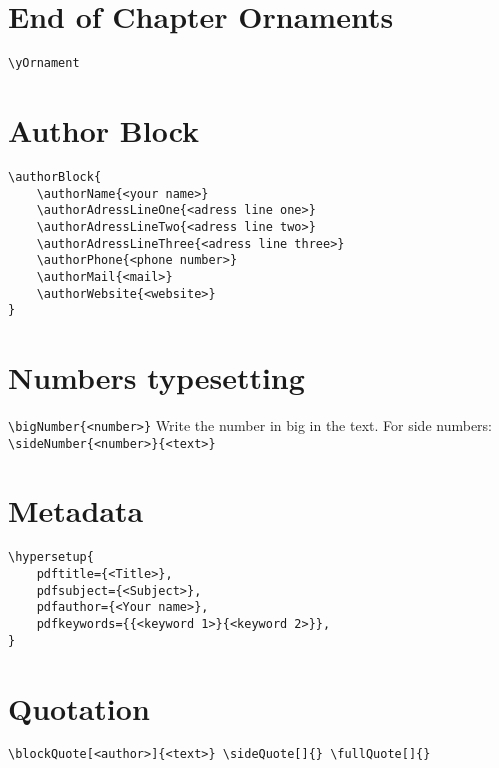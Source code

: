 \documentclass[a4paper, 11pt, oneside, fleqn]{article}
\begin{document}
\begin{multicols}{2}
		
		\section{End of Chapter Ornaments}
		\lstinline[breaklines]|\yOrnament|
		
		
		\section{Author Block}
		\begin{lstlisting}[breaklines]
\authorBlock{
	\authorName{<your name>}
	\authorAdressLineOne{<adress line one>}
	\authorAdressLineTwo{<adress line two>}
	\authorAdressLineThree{<adress line three>}
	\authorPhone{<phone number>}
	\authorMail{<mail>}
	\authorWebsite{<website>}
}
		\end{lstlisting}
		
		
		\section{Numbers typesetting}
		\lstinline[breaklines]|\bigNumber{<number>}| Write the number in big in the text. For side numbers: \lstinline[breaklines]|\sideNumber{<number>}{<text>}|
		
		
		\section{Metadata}
		\begin{lstlisting}[breaklines]
\hypersetup{
	pdftitle={<Title>},
	pdfsubject={<Subject>},
	pdfauthor={<Your name>},
	pdfkeywords={{<keyword 1>}{<keyword 2>}},
}
		\end{lstlisting}
		
		
		\section{Quotation}
		\lstinline[breaklines]|\blockQuote[<author>]{<text>} \sideQuote[]{} \fullQuote[]{}|
	\end{multicols}
	
	
\end{document}
